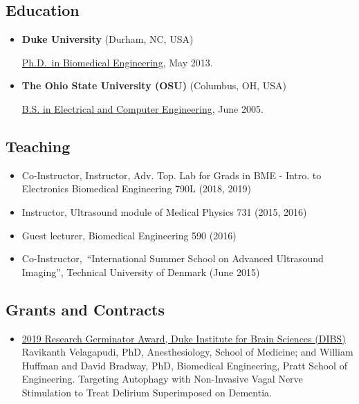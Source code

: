 \documentclass[
]{article}
\providecommand{\tightlist}{%
  \setlength{\itemsep}{0pt}\setlength{\parskip}{0pt}}
\begin{document}
\hypertarget{education}{%
\subsection{Education}\label{education}}

\begin{itemize}
\item
  \textbf{Duke University} (Durham, NC, USA)

  \href{http://bme.duke.edu/grad}{Ph.D.~in Biomedical Engineering}, May
  2013.
\item
  \textbf{The Ohio State University (OSU)} (Columbus, OH, USA)

  \href{http://ece.osu.edu/futurestudents/undergrad}{B.S. in Electrical
  and Computer Engineering}, June 2005.
\end{itemize}

\hypertarget{teaching}{%
\subsection{Teaching}\label{teaching}}

\begin{itemize}
\tightlist
\item
  Co-Instructor, Instructor, Adv. Top. Lab for Grads in BME - Intro. to
  Electronics Biomedical Engineering 790L (2018, 2019)
\item
  Instructor, Ultrasound module of Medical Physics 731 (2015, 2016)
\item
  Guest lecturer, Biomedical Engineering 590 (2016)
\item
  Co-Instructor,~``International Summer School on Advanced Ultrasound
  Imaging'', Technical University of Denmark (June 2015)
\end{itemize}

\hypertarget{grants-and-contracts}{%
\subsection{Grants and Contracts}\label{grants-and-contracts}}

\begin{itemize}
\tightlist
\item
  \href{https://dibs.duke.edu/research/awards/schedule-application}{2019
  Research Germinator Award, Duke Institute for Brain Sciences (DIBS)}
  Ravikanth Velagapudi, PhD, Anesthesiology, School of Medicine; and
  William Huffman and David Bradway, PhD, Biomedical Engineering, Pratt
  School of Engineering. Targeting Autophagy with Non-Invasive Vagal
  Nerve Stimulation to Treat Delirium Superimposed on Dementia.
\end{itemize}
\end{document}
